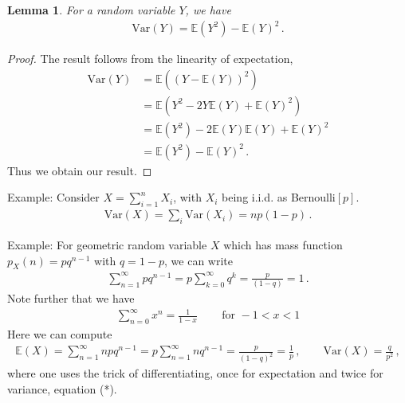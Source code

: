 \documentclass[11pt, onesided]{book}
\theoremstyle{break}
\theoremstyle{break}
\newtheorem{lem}{Lemma}[thm]
\newcommand{\N}{\mathbb{N}}
\newcommand{\example}{\color{green}Example: \color{black}}
\begin{document}
\begin{lem}
For a random variable $Y$, we have
\begin{align*}
\text{Var}(Y) = \mathbb{E}(Y^2) - \mathbb{E}(Y)^2\,.
\end{align*}
\end{lem}
\begin{proof}
The result follows from the linearity of expectation,
\begin{align*}
\text{Var}(Y) 
&= \mathbb{E}((Y-\mathbb{E}(Y))^2) \\
&= \mathbb{E}(Y^2 - 2Y\mathbb{E}(Y)+ \mathbb{E}(Y)^2) \\
&= \mathbb{E}(Y^2) - 2\mathbb{E}(Y)\mathbb{E}(Y) + \mathbb{E}(Y)^2 \\
&= \mathbb{E}(Y^2) - \mathbb{E}(Y)^2\,.
\end{align*}
Thus we obtain our result.
\end{proof}


\example Consider $X = \sum_{i=1}^n X_i$, with $X_i$ being i.i.d. as Bernoulli$[p]$.
\begin{align*}
\text{Var}(X) = \sum_i \text{Var}(X_i) = np(1-p)\,.
\end{align*}

\example For geometric random variable $X$ which has mass function $p_X(n) = pq^{n-1}$ with $q = 1-p$, we can write
\begin{align*}
\sum_{n=1}^\infty pq^{n-1} = p \sum_{k=0}^\infty q^k = \frac{p}{(1-q)} = 1\,.
\end{align*}
Note further that we have
\begin{align*}
\sum_{n=0}^\infty x^n = \frac{1}{1-x} \,\qquad \text{for }-1<x<1 \tag{*}
\end{align*}
Here we can compute
\begin{align*}
\mathbb{E}(X) = \sum_{n=1}^\infty npq^{n-1} = p\sum_{n=1}^\infty nq^{n-1} =\frac{p}{(1-q)^2} = \frac{1}{p}\,,
\qquad
\text{Var}(X) = \frac{q}{p^2}
\,,
\end{align*}
where one uses the trick of differentiating, once for expectation and twice for variance, equation (*).\\


\end{document}
